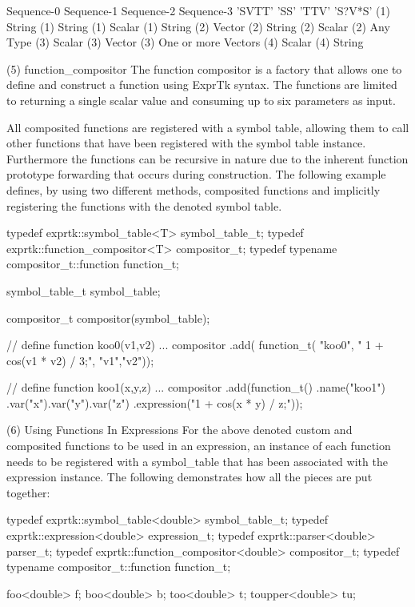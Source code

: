 Sequence-0    Sequence-1    Sequence-2    Sequence-3
'SVTT'         'SS'          'TTV'       'S?V*S'
(1) String    (1) String    (1) Scalar    (1) String
(2) Vector    (2) String    (2) Scalar    (2) Any Type
(3) Scalar                  (3) Vector    (3) One or more Vectors
(4) Scalar                                (4) String


(5) function\_compositor
The function  compositor is  a factory  that allows  one to define and
construct a function using ExprTk syntax. The functions are limited to
returning a single scalar value and consuming up to six parameters  as
input.

All composited functions are registered with a symbol table,  allowing
them to call other functions that have been registered with the symbol
table instance. Furthermore the  functions can be recursive  in nature
due to the inherent  function prototype forwarding that  occurs during
construction.  The following  example  defines, by using two different
methods, composited functions and implicitly registering the functions
with the denoted symbol table.

typedef exprtk::symbol\_table<T>         symbol\_table\_t;
typedef exprtk::function\_compositor<T>    compositor\_t;
typedef typename compositor\_t::function     function\_t;

symbol\_table\_t symbol\_table;

compositor\_t compositor(symbol\_table);

// define function koo0(v1,v2) { ... }
compositor
.add(
function\_t(
"koo0",
" 1 + cos(v1 * v2) / 3;",
"v1","v2"));

// define function koo1(x,y,z) { ... }
compositor
.add(function\_t()
.name("koo1")
.var("x").var("y").var("z")
.expression("1 + cos(x * y) / z;"));


(6) Using Functions In Expressions
For the above denoted custom and composited functions to be used in an
expression, an instance of each function needs to be registered with a
symbol\_table that  has been  associated with  the expression instance.
The following demonstrates how all the pieces are put together:

typedef exprtk::symbol\_table<double>      symbol\_table\_t;
typedef exprtk::expression<double>          expression\_t;
typedef exprtk::parser<double>                  parser\_t;
typedef exprtk::function\_compositor<double> compositor\_t;
typedef typename compositor\_t::function       function\_t;

foo<double> f;
boo<double> b;
too<double> t;
toupper<double> tu;


